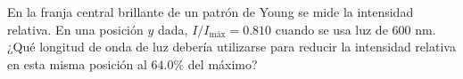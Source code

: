 \item En la franja central brillante de un patrón de Young se mide la intensidad relativa. En una posición $y$ dada, $I/I_{\text{máx}} = 0.810$ cuando se usa luz de $600\text{ nm}$. ¿Qué longitud de onda de luz debería utilizarse para reducir la intensidad relativa en esta misma posición al $64.0\%$ del máximo?